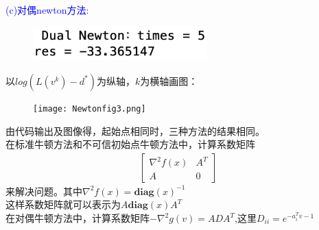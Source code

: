 \documentclass{article}
\begin{document}
\textcolor{blue}{(c)对偶newton方法:}\\

\begin{figure}[H] 
    \centering 
    \includegraphics[width=0.6\textwidth]{Newtonres3.png}
\end{figure}
以$log(L(v^k) - d^*)$为纵轴，$k$为横轴画图：
\begin{figure}[H] 
    \centering 
    \texttt{[image: Newtonfig3.png]}
\end{figure}
由代码输出及图像得，起始点相同时，三种方法的结果相同。\\
在标准牛顿方法和不可信初始点牛顿方法中，计算系数矩阵
$$
\begin{gathered}
    \left[
        \begin{array}{cccc}
            \nabla ^2f(x) & A^T \\
            A & 0
        \end{array} 
    \right]
\end{gathered}
$$
来解决问题。其中$\nabla ^2f(x) = \textbf{diag}(x)^{-1}$\\ 
这样系数矩阵就可以表示为$A\textbf{diag}(x)A^T$\\
在对偶牛顿方法中，计算系数矩阵$-\nabla ^2 g(v) = ADA^T$,这里$D_{ii} = e^{-a^T_i v - 1}$\\
\end{document}
